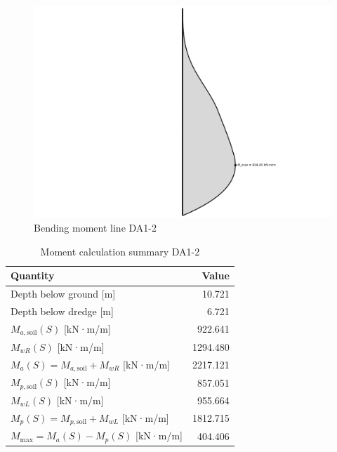 \begin{figure}[H]
    \centering
    \includegraphics[width=0.80\linewidth]{figures/appendix-i/bending_moments_line_DA1_2.png}
    \caption{Bending moment line DA1-2}
    \label{fig:appendix_bending_moments_DA1_2}
\end{figure}

\begin{table}[H]
  \centering
  \caption{Moment calculation summary DA1-2}
  \label{tab:moment_summary}
  \small
  \setlength{\tabcolsep}{8pt}
  \renewcommand{\arraystretch}{1.15}
  \begin{tabular}{@{}l r@{}}
    \toprule
    Quantity & Value \\
    \midrule
    Depth below ground [m] & 10.721 \\
    Depth below dredge [m] & 6.721 \\
    $M_{a,\text{soil}}(S)$ [kN·m/m] & 922.641 \\
    $M_{wR}(S)$ [kN·m/m] & 1294.480 \\
    $M_{a}(S) = M_{a,\text{soil}} + M_{wR}$ [kN·m/m] & 2217.121 \\
    $M_{p,\text{soil}}(S)$ [kN·m/m] & 857.051 \\
    $M_{wL}(S)$ [kN·m/m] & 955.664 \\
    $M_{p}(S) = M_{p,\text{soil}} + M_{wL}$ [kN·m/m] & 1812.715 \\
    $M_{\text{max}} = M_{a}(S) - M_{p}(S)$ [kN·m/m] & 404.406 \\
    \bottomrule
  \end{tabular}
\end{table}




